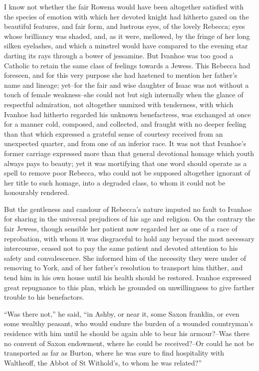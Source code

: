I know not whether the fair Rowena would have been altogether satisfied
with the species of emotion with which her devoted knight had hitherto
gazed on the beautiful features, and fair form, and lustrous eyes, of
the lovely Rebecca; eyes whose brilliancy was shaded, and, as it were,
mellowed, by the fringe of her long silken eyelashes, and which a
minstrel would have compared to the evening star darting its rays
through a bower of jessamine. But Ivanhoe was too good a Catholic to
retain the same class of feelings towards a Jewess. This Rebecca had
foreseen, and for this very purpose she had hastened to mention her
father's name and lineage; yet--for the fair and wise daughter of Isaac
was not without a touch of female weakness--she could not but sigh
internally when the glance of respectful admiration, not altogether
unmixed with tenderness, with which Ivanhoe had hitherto regarded his
unknown benefactress, was exchanged at once for a manner cold, composed,
and collected, and fraught with no deeper feeling than that which
expressed a grateful sense of courtesy received from an unexpected
quarter, and from one of an inferior race. It was not that Ivanhoe's
former carriage expressed more than that general devotional homage which
youth always pays to beauty; yet it was mortifying that one word should
operate as a spell to remove poor Rebecca, who could not be supposed
altogether ignorant of her title to such homage, into a degraded class,
to whom it could not be honourably rendered.

But the gentleness and candour of Rebecca's nature imputed no fault to
Ivanhoe for sharing in the universal prejudices of his age and religion.
On the contrary the fair Jewess, though sensible her patient now
regarded her as one of a race of reprobation, with whom it was
disgraceful to hold any beyond the most necessary intercourse, ceased
not to pay the same patient and devoted attention to his safety and
convalescence. She informed him of the necessity they were under of
removing to York, and of her father's resolution to transport him
thither, and tend him in his own house until his health should be
restored. Ivanhoe expressed great repugnance to this plan, which he
grounded on unwillingness to give farther trouble to his benefactors.

``Was there not,'' he said, ``in Ashby, or near it, some Saxon franklin,
or even some wealthy peasant, who would endure the burden of a wounded
countryman's residence with him until he should be again able to bear
his armour?--Was there no convent of Saxon endowment, where he could be
received?--Or could he not be transported as far as Burton, where he was
sure to find hospitality with Waltheoff, the Abbot of St Withold's, to
whom he was related?''

